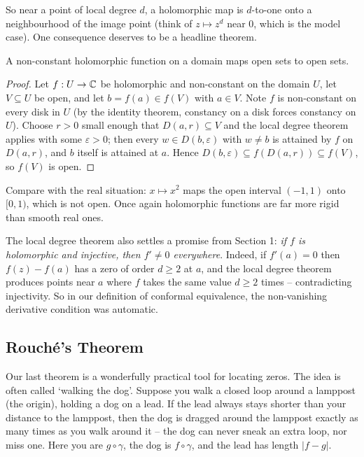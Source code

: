 \documentclass[a4paper]{scrartcl}
\begin{document}
So near a point of local degree $d$, a holomorphic map is $d$-to-one onto a neighbourhood of the image point (think of $z \mapsto z^d$ near $0$, which is the model case). One consequence deserves to be a headline theorem.

\begin{theorem}
    A non-constant holomorphic function on a domain maps open sets to open sets.
\end{theorem}
\begin{proof}
    Let $f: U \rightarrow \mathbb{C}$ be holomorphic and non-constant on the domain $U$, let $V \subseteq U$ be open, and let $b = f(a) \in f(V)$ with $a \in V$. Note $f$ is non-constant on every disk in $U$ (by the identity theorem, constancy on a disk forces constancy on $U$). Choose $r > 0$ small enough that $D(a, r) \subseteq V$ and the local degree theorem applies with some $\varepsilon > 0$; then every $w \in D(b, \varepsilon)$ with $w \neq b$ is attained by $f$ on $D(a, r)$, and $b$ itself is attained at $a$. Hence $D(b, \varepsilon) \subseteq f(D(a, r)) \subseteq f(V)$, so $f(V)$ is open.
\end{proof}

\begin{remark}
    Compare with the real situation: $x \mapsto x^2$ maps the open interval $(-1, 1)$ onto $[0, 1)$, which is not open. Once again holomorphic functions are far more rigid than smooth real ones.

    The local degree theorem also settles a promise from Section 1: \emph{if $f$ is holomorphic and injective, then $f' \neq 0$ everywhere}. Indeed, if $f'(a) = 0$ then $f(z) - f(a)$ has a zero of order $d \geq 2$ at $a$, and the local degree theorem produces points near $a$ where $f$ takes the same value $d \geq 2$ times -- contradicting injectivity. So in our definition of conformal equivalence, the non-vanishing derivative condition was automatic.
\end{remark}

\subsection{Rouch\'e's Theorem}

Our last theorem is a wonderfully practical tool for locating zeros. The idea is often called `walking the dog'. Suppose you walk a closed loop around a lamppost (the origin), holding a dog on a lead. If the lead always stays shorter than your distance to the lamppost, then the dog is dragged around the lamppost exactly as many times as you walk around it -- the dog can never sneak an extra loop, nor miss one. Here you are $g \circ \gamma$, the dog is $f \circ \gamma$, and the lead has length $|f - g|$.
\end{document}
